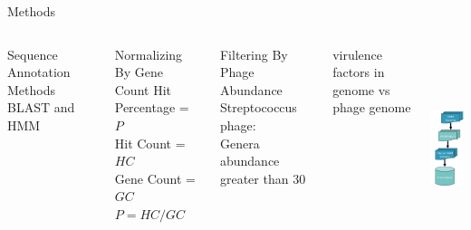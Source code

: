 \documentclass[11pt, xcolor=table]{beamer}
\begin{document}
	\begin{frame}{Methods}
	\begin{columns}
	\begin{block}{Sequence Annotation Methods}
	BLAST and HMM
	\end{block}
	
	\begin{block}{Normalizing By Gene Count}
	Hit Percentage = $P$ \\
	Hit Count = $HC$ \\
	Gene Count = $GC$ \\
	\vspace{0.3cm}
	\hspace{1.5cm}	
	$P = {HC}/{GC}$
	\end{block}
	
	\begin{block}{Filtering By Phage Abundance}
	\alert{Streptococcus} phage: \\
	Genera abundance greater than 30
	\end{block}
	
	virulence factors in genome vs phage genome
	
	\hspace{-2cm}
	\includegraphics[height=6cm, width=3cm]{Pipeline.png}

	\end{columns}
	\end{frame}
	
\end{document}
